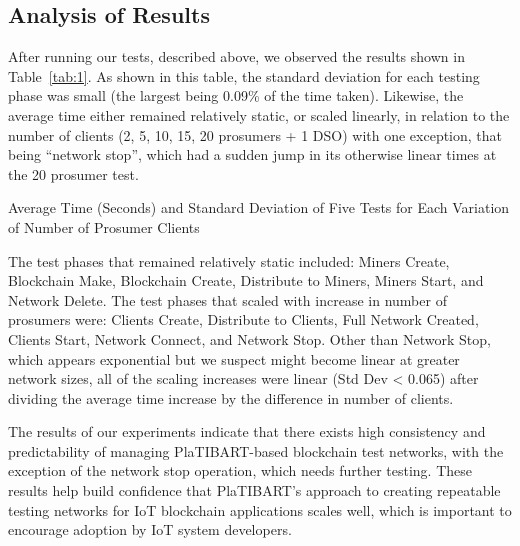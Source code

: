 \subsection{Analysis of Results}
\label{results}
After running our tests, described above, we observed the results shown in Table~\ref{tab:1}. As shown in this table, the standard deviation for each testing phase was small (the largest being 0.09\% of the time taken). Likewise, the average time either remained relatively static, or scaled linearly, in relation to the number of clients (2, 5, 10, 15, 20 prosumers + 1 DSO) with one exception, that being ``network stop'', which had a sudden jump in its otherwise linear times at the 20 prosumer test.

\label{experiment}
\begin{table*}[!htbp]
	\centering
	
	\caption{Average Time (Seconds) and Standard Deviation of Five Tests for Each Variation of Number of Prosumer Clients}
	\label{tab:1}
	\vspace{-0.3in}
\end{table*}

The test phases that remained relatively static included: Miners Create, Blockchain Make, Blockchain Create, Distribute to Miners, Miners Start, and Network Delete. The test phases that scaled with increase in number of prosumers were: Clients Create, Distribute to Clients, Full Network Created, Clients Start, Network Connect, and Network Stop. Other than Network Stop, which appears exponential but we suspect might become linear at greater network sizes, all of the scaling increases were linear (Std Dev < 0.065) after dividing the average time increase by the difference in number of clients. 

The results of our experiments indicate that there exists high consistency and predictability of managing PlaTIBART-based blockchain test networks, with the exception of the network stop operation, which needs further testing. These results help build confidence that PlaTIBART's approach to creating repeatable testing networks for IoT blockchain applications scales well, which is important to encourage adoption by IoT system developers. 


